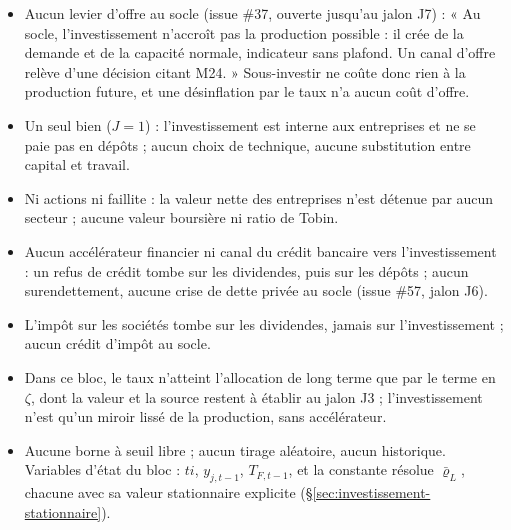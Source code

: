 \documentclass[11pt,a4paper]{article}
\begin{document}
\begin{portee}
\begin{itemize}
\item Aucun levier d'offre au socle (issue \#37, ouverte jusqu'au jalon J7) : « Au socle, l'investissement n'accroît pas la production possible : il crée de la demande et de la capacité normale, indicateur sans plafond. Un canal d'offre relève d'une décision citant M24. » Sous-investir ne coûte donc rien à la production future, et une désinflation par le taux n'a aucun coût d'offre.
\item Un seul bien ($J = 1$) : l'investissement est interne aux entreprises et ne se paie pas en dépôts ; aucun choix de technique, aucune substitution entre capital et travail.
\item Ni actions ni faillite : la valeur nette des entreprises n'est détenue par aucun secteur ; aucune valeur boursière ni ratio de Tobin.
\item Aucun accélérateur financier ni canal du crédit bancaire vers l'investissement : un refus de crédit tombe sur les dividendes, puis sur les dépôts ; aucun surendettement, aucune crise de dette privée au socle (issue \#57, jalon J6).
\item L'impôt sur les sociétés tombe sur les dividendes, jamais sur l'investissement ; aucun crédit d'impôt au socle.
\item Dans ce bloc, le taux n'atteint l'allocation de long terme que par le terme en $\zeta$, dont la valeur et la source restent à établir au jalon J3 ; l'investissement n'est qu'un miroir lissé de la production, sans accélérateur.
\item Aucune borne à seuil libre ; aucun tirage aléatoire, aucun historique. Variables d'état du bloc : $\mathit{ti}$, $y_{j,t-1}$, $T_{F,t-1}$, et la constante résolue $\bar\varrho_L$, chacune avec sa valeur stationnaire explicite (\S\ref{sec:investissement-stationnaire}).
\end{itemize}
\end{portee}

\end{document}
